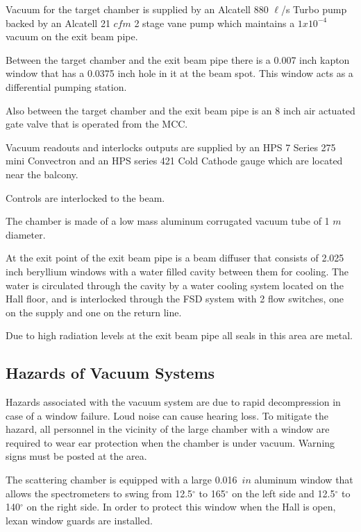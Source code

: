 {Vacuum for the target chamber is supplied by an Alcatell 880
$\ell$/s Turbo pump backed by an Alcatell 21 $cfm$ 2 stage vane pump
which maintains a $1x10^{-4}$ vacuum on the exit beam pipe.

Between the target chamber and the exit beam pipe there is a 0.007 inch
kapton window that has a 0.0375 inch hole in it at the beam spot.  This
window acts as a differential pumping station.

Also between the target chamber and the exit beam pipe is an 8 inch
air actuated gate valve that is operated from the MCC.

Vacuum readouts and interlocks outputs are supplied by an HPS 7 Series 
275 mini Convectron and an HPS series 421 Cold Cathode gauge
which are located near the balcony.

Controls are interlocked to the beam.

The chamber is made of a low mass aluminum corrugated vacuum tube of 1 
$m$ diameter.

At the exit point of the exit beam pipe is a beam diffuser that
consists of 2.025 inch beryllium windows with a water filled cavity between
them for cooling.  The water is circulated through the cavity by a
water cooling system located on the Hall floor, and is interlocked
through the FSD system with 2 flow switches, one on the supply and
one on the return line.

Due to high radiation levels at the exit beam pipe all seals in
this area are metal.
} %

\begin{safetyen}{10}{15}
\section{Hazards of Vacuum Systems}
\end{safetyen}

Hazards associated with the vacuum system are due to rapid 
decompression in case of a window failure. Loud noise can cause hearing
loss.  To mitigate the hazard, all personnel in the vicinity of the 
large chamber with a window are required to wear ear protection when
the chamber is under vacuum. Warning signs must be posted at the area.

The scattering chamber is equipped with a large 0.016~$in$ aluminum window that 
allows the spectrometers to swing from 12.5$^{\circ}$ to 165$^{\circ}$ 
on the left side and 12.5$^{\circ}$ to 140$^{\circ}$ on the right side. 
In order to
protect this window when the Hall is open, lexan window guards are
installed.


